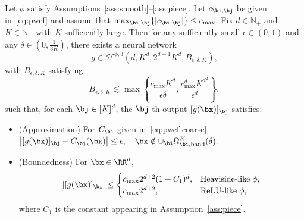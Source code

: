 \documentclass[11pt]{article}
\begin{document}
\begin{lemma}
    Let $\phi$ satisfy Assumptions~\ref{ass:smooth}--\ref{ass:piece}. Let $c_{\bi, \bj}$ be given in~\eqref{eq:pwcf} and assume that $\max_{\bi, \bj} \{|c_{\bi,\bj}|\} \leq c_{\max}$. Fix $d\in\mathbb{N}_{+}$ and $K\in\mathbb{N}_{+}$ with $K$ sufficiently large.
    Then for any sufficiently small $\epsilon \in (0,1)$ and any $\delta \in (0, \frac{1}{3K})$, there exists a neural network 
    \begin{equation*}
        g \in \mathcal{H}^{\phi,3} \left( d, K^d, 2^{d+1} K^d, B_{\epsilon, \delta, K}\right),
    \end{equation*}
    with $B_{\epsilon, \delta, K}$ satisfying
    \begin{equation}
        B_{\epsilon, \delta, K} \lesssim \max \left\{ \frac{c_{\max} K^{d}}{\epsilon \delta}, \frac{c_{\max}^d K^{d^2}}{\epsilon^d}\right\},
        \label{eq:norm_pwcf_coarse}
    \end{equation}
    such that, for each $\bj\in[K]^d$, the $\bj$-th output $[g(\bx)]_{\bj}$ satisfies:
    \begin{itemize}
        \item (Approximation) For $C_{\bj}$ given in~\eqref{eq:pwcf-coarse},
        $\left| [g(\bx)]_{\bj} - C_{\bj}(\bx) \right| \leq \epsilon, \quad \bx \notin \cup_{\bi} \Omega_{\bi, \mathrm{band}}^{K}(\delta).$
        \item (Boundedness) For $\bx \in \RR^d$, 
        \begin{equation*}
            |[g(\bx)]_{\bi}| \le \begin{cases}
                c_{\max}2^{d+2} (1+ C_1)^d, &   \textrm{Heaviside-like} \; \phi ,\\
                c_{\max}2^{d+2}, &  \textrm{ReLU-like} \; \phi,
            \end{cases}   
        \end{equation*}
        where $C_1$ is the constant appearing in Assumption~\ref{ass:piece}.
    \end{itemize}
    \label{lem:dD_pwfc_coarse_app}
\end{lemma}
\end{document}

